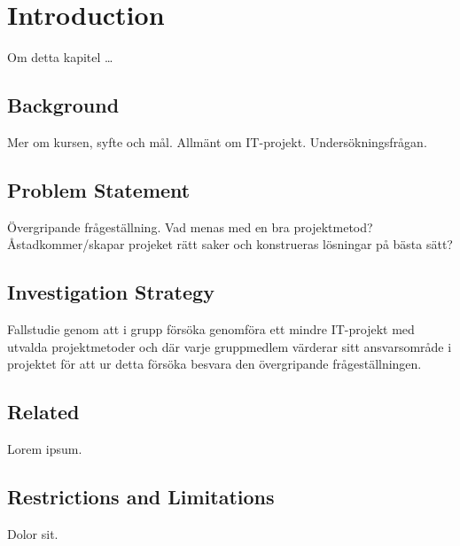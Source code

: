 \section{Introduction}
Om detta kapitel \dots

\subsection{Background}
Mer om kursen, syfte och mål. Allmänt om IT-projekt. Undersökningsfrågan.

\subsection{Problem Statement}
Övergripande frågeställning.
Vad menas med en bra projektmetod? Åstadkommer/skapar projeket rätt saker och konstrueras
lösningar på bästa sätt?

\subsection{Investigation Strategy}
Fallstudie genom att i grupp försöka genomföra ett mindre IT-projekt med utvalda projektmetoder
och där varje gruppmedlem värderar sitt ansvarsområde i projektet för att ur detta försöka
besvara den övergripande frågeställningen.

\subsection{Related}
Lorem ipsum.

\subsection{Restrictions and Limitations}
Dolor sit.